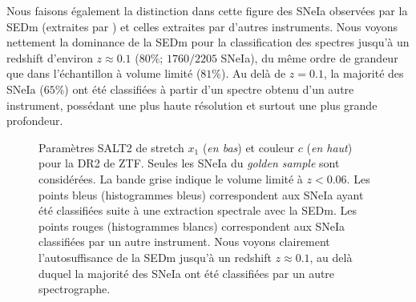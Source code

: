 \documentclass[../main/main.tex]{subfiles}
\begin{document}
Nous faisons également la distinction dans cette figure des SNeIa
observées par la SEDm (extraites par \hypergal) et celles extraites par
d'autres instruments. Nous voyons nettement la dominance de la SEDm pour
la classification des spectres
jusqu'à un redshift d'environ $z\approx0.1$ ($80\%$; $1760/2205$ SNeIa),
du même ordre de grandeur que dans
l'échantillon à volume limité ($81\%$). Au delà de $z=0.1$, la majorité
des SNeIa ($65\%$) ont été classifiées à partir d'un spectre obtenu d'un autre
instrument, possédant une plus haute résolution et surtout une plus
grande profondeur.

\begin{figure}[ht]
  \centering
  \caption[Paramètres SALT2 de stretch et couleur pour la DR2 de
  ZTF]{Paramètres SALT2 de stretch $x_{1}$ (\emph{en bas}) et couleur $c$
    (\emph{en haut}) pour la DR2 de ZTF. Seules les SNeIa du
    \textit{golden sample}
    sont considérées. La bande grise indique le
    volume limité à $z<0.06$. Les points bleus (histogrammes bleus)
    correspondent aux SNeIa ayant été classifiées suite à une extraction
    spectrale avec la SEDm. Les points rouges (histogrammes blancs)
    correspondent aux SNeIa classifiées par un autre instrument. Nous
    voyons clairement l'autosuffisance de la SEDm jusqu'à un redshift
    $z\approx0.1$, au delà duquel la majorité des SNeIa ont été
    classifiées par un autre spectrographe.}
  \label{fig:ztfdr2salt}
\end{figure}
\end{document}
